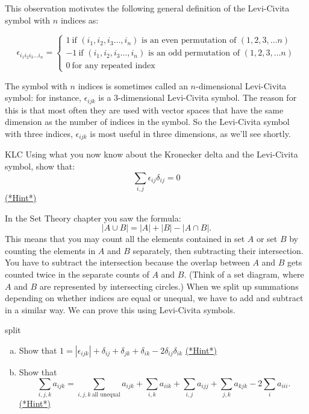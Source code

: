 This observation motivates the following general definition  of the {\bfi Levi-Civita symbol} with $n$ indices as:

\[ \epsilon_{i_1 i_2 i_3…i_n}=
\begin{cases}
1 ~ \text{if $(i_1,i_2,i_3…,i_n)$ is an even permutation of $(1,2,3, \ldots n)$}\\
-1 ~ \text{if $(i_1,i_2,i_3…,i_n)$ is an odd permutation of $(1,2,3, \ldots n)$}\\
0 ~ \text{for any repeated index}
\end{cases} \]

The symbol with $n$ indices is sometimes called an $n$-dimensional Levi-Civita symbol: for instance, $\epsilon_{ijk}$ is a 3-dimensional Levi-Civita symbol.  The reason for this is that most often they are used with vector spaces that have the same dimension as the number of indices in the symbol.  So   the Levi-Civita symbol with three indices, $\epsilon_{ijk}$ is most useful in three dimensions, as we'll see shortly.

\begin{exercise}{KLC}
Using what you now know about the Kronecker delta and the Levi-Civita symbol, show that:
\[
\sum_{i,j} \epsilon_{ij} \delta_{ij}=0
\]
\hyperref[sec:sigma:hints]{(*Hint*)} 
\end{exercise}

In the Set Theory chapter you saw the formula:
\[ |A \cup B| = |A| + |B| - |A \cap B|.\]
This means that you may count all the elements contained in set $A$ or set $B$ by counting the elements in $A$ and $B$ separately, then subtracting their intersection.  You have to  subtract the intersection because  the overlap between $A$ and $B$ gets counted twice in the separate counts of $A$ and $B$.  (Think of a set diagram, where $A$ and $B$ are represented by intersecting circles.)  When we split up summations depending on whether indices are equal or unequal, we have to add and subtract in a similar way. We can prove this using Levi-Civita symbols.
  
\begin{exercise}{split}
\begin{enumerate}[(a)]
\item
Show that $1=|\epsilon_{ijk}|+\delta_{ij}+\delta_{jk}+\delta_{ik}-2\delta_{ij}\delta_{ik}$ 
\hyperref[sec:sigma:hints]{(*Hint*)} 
\item
Show that 
\[
\sum_{i,j,k} a_{ijk}=\sum_{i,j,k~\text{all unequal}}a_{ijk}+\sum_{i,k}a_{iik}+\sum_{i,j}a_{ijj}+\sum_{j,k}a_{kjk}-2\sum_{i}a_{iii}.
\]
\hyperref[sec:sigma:hints]{(*Hint*)} 
\end{enumerate}
\end{exercise}


